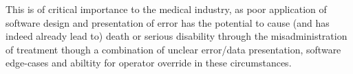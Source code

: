 \documentclass[12pt, a4paper]{article}
\begin{document}
This is of critical importance to the medical industry, as poor application of software design and presentation of error has the potential to cause (and has indeed already lead to) death or serious disability through the misadministration of treatment though a combination of unclear error/data presentation, software edge-cases and abiltity for operator override in these circumstances.



\end{document}
